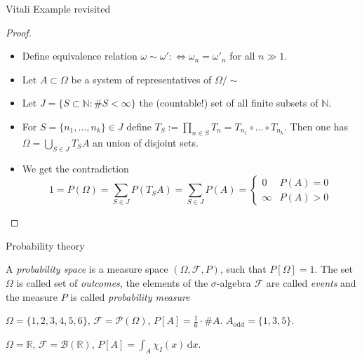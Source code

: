 \documentclass[compress]{beamer}
\newcommand{\RR}{\mathbb{R}}
\newcommand{\NN}{\mathbb{N}}
\newcommand{\td}{\,\mathrm{d}}  %
\begin{document}
\begin{frame}{Vitali Example revisited}
  \begin{proof}
    \begin{itemize}
    \item Define equivalence relation $\omega \sim \omega' :\Leftrightarrow
      \omega_n = \omega'_n$ for all $n \gg 1$.
    \item Let $A \subset \Omega$ be a system of representatives of $\Omega/\sim$
    \item Let $J = \{S \subset \NN: \#S < \infty\}$ the (countable!) set of all
      finite subsets of $\NN$.
    \item For $S = \{n_1, \dots, n_k\} \in J$ define $T_S:= \prod_{n \in S}T_n =
      T_{n_1}\circ \dots \circ T_{n_k}$. Then one has $\Omega=\bigcup_{S \in J}
      T_S A$ an union of disjoint sets.
    \item We get the contradiction
      \[
      1 = P(\Omega) = \sum_{S\in J} P(T_S A) = \sum_{S \in J} P(A) =
      \begin{cases}
        0 & P(A) = 0\\
        \infty & P(A) >0
      \end{cases}
      \]
    \end{itemize}
  \end{proof}
\end{frame}

\begin{frame}{Probability theory}
  \begin{definition}
    A \textit{probability space} is a measure space $(\Omega, \mathcal{F}, P)$,
    such that $P[\Omega]=1$.  The set $\Omega$ is called set of
    \textit{outcomes}, the elements of the $\sigma$-algebra $\mathcal{F}$ are
    called \textit{events} and the measure $P$ is called \textit{probability
      measure}
  \end{definition}
  \pause
  \begin{example}
    $\Omega=\{1,2,3,4,5,6\}$, $\mathcal{F} = \mathcal{P}(\Omega)$, $P[A] =
    \frac16\cdot \#A$. $A_{\text{odd}}=\{1,3,5\}$.
  \end{example}

  \begin{example}[Uniform on $I$]
    $\Omega=\RR$, $\mathcal{F} = \mathcal{B}(\RR)$, $P[A] = \int_A \chi_I(x)\td
    x$.
  \end{example}
\end{frame}
\end{document}
